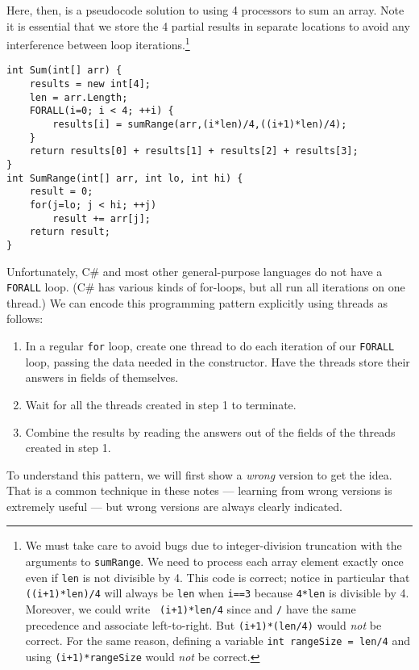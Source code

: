 \documentclass[10pt]{article}
\begin{document}
Here, then, is a pseudocode solution to using 4 processors to sum an
array.  Note it is essential that we store the 4 partial results in
separate locations to avoid any interference between loop
iterations.\footnote{We must take care to avoid bugs due to
  integer-division truncation with the arguments to {\tt sumRange}.
  We need to process each array element exactly once even if {\tt len} is
  not divisible by 4.  This code is correct; notice in particular that
  {\tt ((i+1)*len)/4} will always be {\tt len} when {\tt i==3} because
  {\tt 4*len} is divisible by 4.  Moreover, we could write {\tt
    (i+1)*len/4} since {\tt *} and {\tt /} have the same precedence
  and associate left-to-right.  But {\tt (i+1)*(len/4)} would
  \emph{not} be correct.  For the same reason, defining a variable
  {\tt int rangeSize = len/4} and using {\tt (i+1)*rangeSize} would
  \emph{not} be correct.}
\goodbreak
\begin{verbatim}
int Sum(int[] arr) {
    results = new int[4];
    len = arr.Length;
    FORALL(i=0; i < 4; ++i) {
        results[i] = sumRange(arr,(i*len)/4,((i+1)*len)/4);
    }
    return results[0] + results[1] + results[2] + results[3];
}
int SumRange(int[] arr, int lo, int hi) {
    result = 0;
    for(j=lo; j < hi; ++j)
        result += arr[j];
    return result;
}
\end{verbatim}

Unfortunately, C\# and most other general-purpose languages do not
have a {\tt FORALL} loop.  (C\# has various kinds of for-loops, but
all run all iterations on one thread.)  We can encode this programming pattern
explicitly using threads as follows:
\begin{enumerate}
\item In a regular {\tt for} loop, create one thread to do each
  iteration of our {\tt FORALL} loop, passing the data needed in the
  constructor.  Have the threads store their answers in fields of
  themselves.
\item Wait for all the threads created in step 1 to
  terminate.
\item Combine the results by reading the answers out of the fields of
  the threads created in step 1.
\end{enumerate}

To understand this pattern, we will first show a \emph{wrong}
version to get the idea.  That is a common technique in these notes
--- learning from wrong versions is extremely useful --- but wrong
versions are always clearly indicated.
\end{document}

